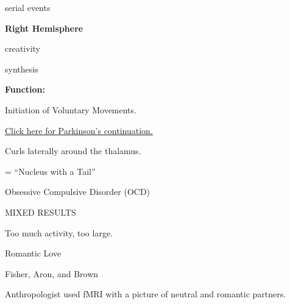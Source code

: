 \begin{coloredlist}
\begin{coloredlist}
\begin{coloredlist}
\begin{coloredlist}
                \item serial events
            \end{coloredlist}
            \item \textbf{Right Hemisphere}
            \begin{coloredlist}
                \item creativity
                \item synthesis
            \end{coloredlist}
        \end{coloredlist}
    \end{coloredlist}
    \item {}
    \begin{coloredlist}
        \item \textbf{Function:}
        \begin{coloredlist}
            \item Initiation of Voluntary Movements.
            \item \hyperlink{parkinson}{Click here for Parkinson's continuation.}
        \end{coloredlist}
    \end{coloredlist}
    \item Curls laterally around the thalamus.
    \item {}
    \begin{coloredlist}
        \item {} = ``Nucleus with a Tail''
        \begin{coloredlist}
            \item Obsessive Compulsive Disorder (OCD)
            \begin{coloredlist}
                \item MIXED RESULTS
                \begin{coloredlist}
                    \item Too much activity, too large.
                \end{coloredlist}
            \end{coloredlist}
            \item Romantic Love
            \begin{coloredlist}
                \item Fisher, Aron, and Brown
                \begin{coloredlist}
                    \item Anthropologist used fMRI with a picture of neutral and romantic partners.

\end{coloredlist}
\end{coloredlist}
\end{coloredlist}
\end{coloredlist}
\end{coloredlist}
